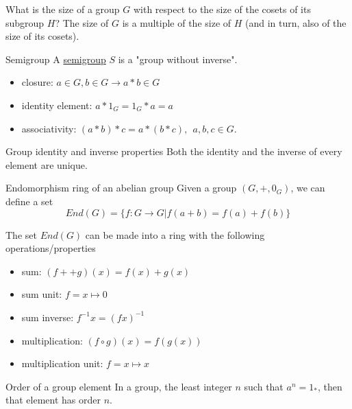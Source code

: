 \documentclass[presentation]{beamer}
\begin{document}
\begin{frame}[label={sec:orgedf17cd}]{What is the size of a group \(G\) with respect to the size of the cosets of its subgroup \(H\)?}
The size of \(G\) is a multiple of the size of \(H\) (and in turn, also of the size of its cosets).
\end{frame}

\begin{frame}[label={sec:org26868d9}]{Semigroup}
A \href{https://en.wikipedia.org/wiki/Semigroup}{semigroup} \(S\) is a "group without inverse".

\begin{itemize}
\item \alert{closure}: \(a \in G, b \in G \rightarrow a * b \in G\)
\item \alert{identity element}: \(a * 1_G = 1_G * a = a\)
\item \alert{associativity}: \((a * b) * c = a * (b * c),~~a,b,c \in G\).
\end{itemize}
\end{frame}



\begin{frame}[label={sec:org0c98aec}]{Group identity and inverse properties}
Both the identity and the inverse of every element are \alert{unique}.
\end{frame}

\begin{frame}[label={sec:orgb71c60d}]{Endomorphism ring of an abelian group}
Given a group \((G,+,0_G)\), we can define a set
\[
      End(G) = \{ f: G \rightarrow G | f(a + b) = f(a) + f(b) \}
    \]

The set \(End(G)\) can be made into a \alert{ring} with the following
operations/properties

\begin{itemize}
\item sum: \((f ++ g)(x) = f(x) + g(x)\)
\item sum unit: \(f = x \mapsto 0\)
\item sum inverse: \(f^{-1}x = (f x)^{-1}\)
\item multiplication: \((f \circ g)(x) = f(g(x))\)
\item multiplication unit: \(f = x \mapsto x\)
\end{itemize}
\end{frame}

\begin{frame}[label={sec:org342e68c}]{Order of a group element}
In a group, the least integer \(n\) such that \(a^n=1_{*}\), then that element
has order \(n\).
\end{frame}
\end{document}
